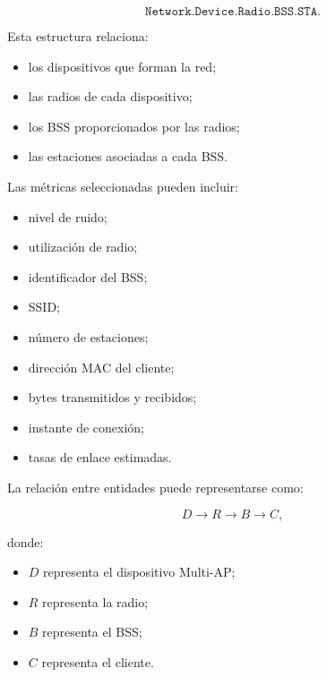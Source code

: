\[
    \texttt{Network.Device.Radio.BSS.STA}.
\]

Esta estructura relaciona:

\begin{itemize}
    \item los dispositivos que forman la red;

    \item las radios de cada dispositivo;

    \item los BSS proporcionados por las radios;

    \item las estaciones asociadas a cada BSS.
\end{itemize}

Las métricas seleccionadas pueden incluir:

\begin{itemize}
    \item nivel de ruido;

    \item utilización de radio;

    \item identificador del BSS;

    \item SSID;

    \item número de estaciones;

    \item dirección MAC del cliente;

    \item bytes transmitidos y recibidos;

    \item instante de conexión;

    \item tasas de enlace estimadas.
\end{itemize}

La relación entre entidades puede representarse como:

\[
    D
    \longrightarrow
    R
    \longrightarrow
    B
    \longrightarrow
    C,
\]

donde:

\begin{itemize}
    \item \(D\) representa el dispositivo Multi-AP;

    \item \(R\) representa la radio;

    \item \(B\) representa el BSS;

    \item \(C\) representa el cliente.
\end{itemize}

